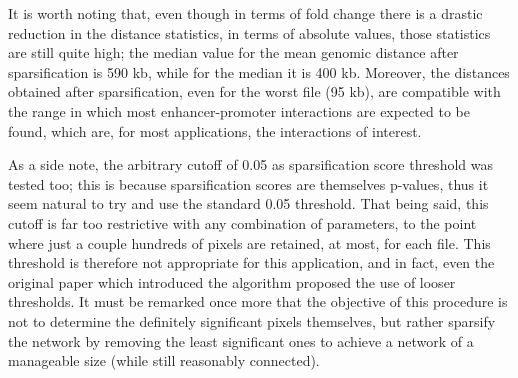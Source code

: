 It is worth noting that, even though in terms of fold change there is a drastic reduction in the distance statistics, in terms of absolute values, those statistics are still quite high; the median value for the mean genomic distance after sparsification is 590 kb, while for the median it is 400 kb. Moreover, the distances obtained after sparsification, even for the worst file (95 kb), are compatible with the range in which most enhancer-promoter interactions are expected to be found, which are, for most applications, the interactions of interest.

As a side note, the arbitrary cutoff of 0.05 as sparsification score threshold was tested too; this is because sparsification scores are themselves p-values, thus it seem natural to try and use the standard 0.05 threshold. That being said, this cutoff is far too restrictive with any combination of parameters, to the point where just a couple hundreds of pixels are retained, at most, for each file. This threshold is therefore not appropriate for this application, and in fact, even the original paper which introduced the algorithm proposed the use of looser thresholds. It must be remarked once more that the objective of this procedure is not to determine the definitely significant pixels themselves, but rather sparsify the network by removing the least significant ones to achieve a network of a manageable size (while still reasonably connected). 

